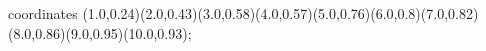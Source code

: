 					coordinates { (1.0,0.24)(2.0,0.43)(3.0,0.58)(4.0,0.57)(5.0,0.76)(6.0,0.8)(7.0,0.82)(8.0,0.86)(9.0,0.95)(10.0,0.93)};
